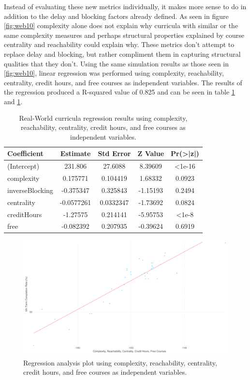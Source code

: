 \documentclass[botnum, fleqn]{unmeethesis}
\begin{document}
    Instead of evaluating these new metrics individually, it makes more sense to do in addition to the delay and blocking factors already defined.  As seen in figure \ref{fig:web10} complexity alone does not explain why curricula with similar or the same complexity measures and perhaps structural properties explained by course centrality and reachability could explain why. These metrics don't attempt to replace delay and blocking, but rather compliment them in capturing structural qualities that they don't. Using the same simulation results as those seen in \ref{fig:web10}, linear regression was performed using complexity, reachability, centrality, credit hours, and free courses as independent variables. The results of the regression produced a R-squared value of 0.825 and can be seen in table \ref{tab:webAll} and \ref{fig:webAll}.

    \begin{table}[!h]
      \centering
      \caption{Real-World curricula regression results using complexity, reachability, centrality, credit hours, and free courses as independent variables.}
      \label{tab:webAll}
      \begin{tabular}{l*{4}{c}}
        Coefficient       & Estimate      & Std Error   & Z Value     & Pr(>|z|)  \\
        \hline
        (Intercept)       &     231.806   &   27.6088   &  8.39609    &   <1e-16  \\
        complexity        &    0.175771   &  0.104419   &  1.68332    &   0.0923  \\
        inverseBlocking   &   -0.375347   &  0.325843   & -1.15193    &   0.2494  \\
        centrality        &  -0.0577261   & 0.0332347   & -1.73692    &   0.0824  \\
        creditHours       &    -1.27575   &  0.214141   & -5.95753    &    <1e-8  \\
        free              &   -0.082392   &  0.207935   & -0.39624    &   0.6919  \\
      \end{tabular}
    \end{table}

    \begin{figure}[h!]
      \centerline{\includegraphics[scale=0.25]{./figures/webAll.png}}
      \caption{Regression analysis plot using complexity, reachability, centrality, credit hours, and free courses as independent variables.} 
      \label{fig:webAll}
    \end{figure}
\end{document}
